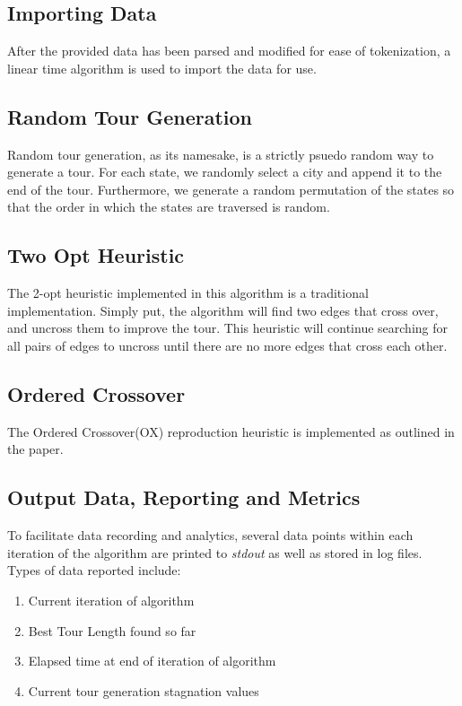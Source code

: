 \documentclass[12pt]{article}
\begin{document}
\subsection{Importing Data}

After the provided data has been parsed and modified for ease of tokenization, a linear time algorithm is used to import the data for use. 

\subsection{Random Tour Generation}

Random tour generation, as its namesake, is a strictly psuedo random way to generate a tour. For each state, we randomly select a city and append it to the end of the tour. Furthermore, we generate a random permutation of the states so that the order in which the states are traversed is random.

\subsection{Two Opt Heuristic}

The 2-opt heuristic implemented in this algorithm is a traditional implementation. Simply put, the algorithm will find two edges that cross over, and uncross them to improve the tour. This heuristic will continue searching for all pairs of edges to uncross until there are no more edges that cross each other.
\subsection{Ordered Crossover}

The Ordered Crossover(OX) reproduction heuristic is implemented as outlined in the paper. 

\subsection{Output Data, Reporting and Metrics}

To facilitate data recording and analytics, several data points within each iteration of the algorithm are printed to \textit{stdout} as well as stored in log files. Types of data reported include:
\begin{enumerate}
  \item Current iteration of algorithm
  \item Best Tour Length found so far
  \item Elapsed time at end of iteration of algorithm
  \item Current tour generation stagnation values
\end{enumerate}
\end{document}

